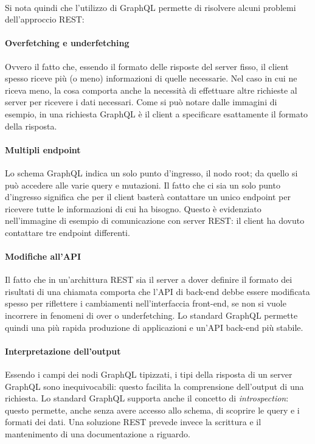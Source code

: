 \documentclass[a4paper, 12pt]{report}
\begin{document}
      \paragraph*{}Si nota quindi che l'utilizzo di GraphQL permette di risolvere alcuni problemi dell'approccio REST:
      \paragraph*{Overfetching e underfetching} 
        Ovvero il fatto che, essendo il formato delle risposte del server fisso, il client spesso riceve più (o meno) informazioni di quelle necessarie.
        Nel caso in cui ne riceva meno, la cosa comporta anche la necessità di effettuare altre richieste al server per ricevere i dati necessari.
        Come si può notare dalle immagini di esempio, in una richiesta GraphQL è il client a specificare esattamente il formato della risposta.
      \paragraph*{Multipli endpoint}
        Lo schema GraphQL indica un solo punto d'ingresso, il nodo root; da quello si può accedere alle varie query e mutazioni.
        Il fatto che ci sia un solo punto d'ingresso significa che per il client basterà contattare un unico endpoint per ricevere tutte le informazioni di cui ha bisogno.
        Questo è evidenziato nell'immagine di esempio di comunicazione con server REST: il client ha dovuto contattare tre endpoint differenti.
      \paragraph*{Modifiche all'API}
        Il fatto che in un'archittura REST sia il server a dover definire il formato dei risultati di una chiamata comporta che l'API di back-end debbe essere modificata spesso per riflettere i cambiamenti nell'interfaccia front-end, se non si vuole
        incorrere in fenomeni di over o underfetching.
        Lo standard GraphQL permette quindi una più rapida produzione di applicazioni e un'API back-end più stabile.
      \paragraph*{Interpretazione dell'output}
        Essendo i campi dei nodi GraphQL tipizzati, i tipi della risposta di un server GraphQL sono inequivocabili: questo facilita la comprensione dell'output di una richiesta.
        Lo standard GraphQL supporta anche il concetto di \emph{introspection}: questo permette, anche senza avere accesso allo schema, di scoprire le query e i formati dei dati.
        Una soluzione REST prevede invece la scrittura e il mantenimento di una documentazione a riguardo.
\end{document}

